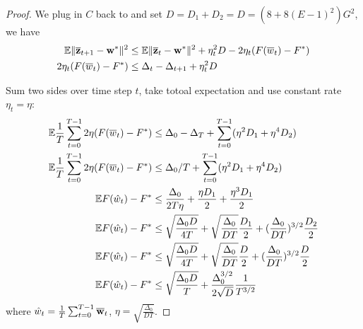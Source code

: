 \begin{proof}
We plug in $C$ back to \eq{\ref{eq:nagcvx7}} and set $D=D_1 + D_2 = D = (8 + 8(E-1)^2)G^2$, we have 
\begin{align}
\mathbb{E}\|\overline{{\mathbf{z}}}_{t+1} - {\mathbf{w}}^* \|^2 & \leq \mathbb{E} \| \overline{{\mathbf{z}}}_{t} - {\mathbf{w}}^*\|^2  +  \eta_t^2 D   - 2\eta_t(F(\overline{w}_t) - F^*) \nonumber\\	
 2\eta_t(F(\overline{w}_t) - F^*) & \leq  \Delta_{t}  - \Delta_{t+1}  +  \eta_t^2 D    \nonumber
\end{align}

Sum two sides over time step $t$, take totoal expectation and use constant rate $\eta_t = \eta$:
\begin{align}
\mathbb{E} \frac{1}{T}\sum_{t=0}^{T-1} 2 \eta (F(\overline{w}_t) - F^*) & \leq \Delta_0 - \Delta_{T} + \sum_{t=0}^{T-1} (\eta^2 D_1 + \eta^4 D_2) \nonumber\\
\mathbb{E} \frac{1}{T}\sum_{t=0}^{T-1} 2 \eta (F(\overline{w}_t) - F^*) & \leq \Delta_0/T  + \sum_{t=0}^{T-1} (\eta^2 D_1 + \eta^4 D_2)\nonumber\\
 \mathbb{E} F(\hat{w}_t) - F^* & \leq \frac{\Delta_0}{2T\eta}   + \frac{\eta D_1}{2} + \frac{\eta^3 D_1}{2}\nonumber\\
 \mathbb{E} F(\hat{w}_t) - F^* & \leq \sqrt{\frac{\Delta_0D}{4T}} + \sqrt{\frac{\Delta_0}{DT}}\frac{ D_1}{2} + (\frac{\Delta_0}{DT})^{3/2}\frac{ D_2}{2} \nonumber\\
 \mathbb{E} F(\hat{w}_t) - F^* & \leq \sqrt{\frac{\Delta_0D}{4T}} + \sqrt{\frac{\Delta_0}{DT}}\frac{ D}{2} + (\frac{\Delta_0}{DT})^{3/2}\frac{ D}{2} \nonumber\\
 \mathbb{E} F(\hat{w}_t) - F^* & \leq \sqrt{\frac{\Delta_0D}{T}} + \frac{\Delta_0^{3/2}}{2\sqrt{D}}\frac{1}{T^{3/2}} \label{eq:nagcvxc4}\\
\end{align}
where $\hat{w}_t = \frac{1}{T}\sum_{t=0}^{T-1} {\overline{\mathbf{w}}}_t$, $\eta = \sqrt{\frac{\Delta_0}{DT}}$.



\end{proof}
